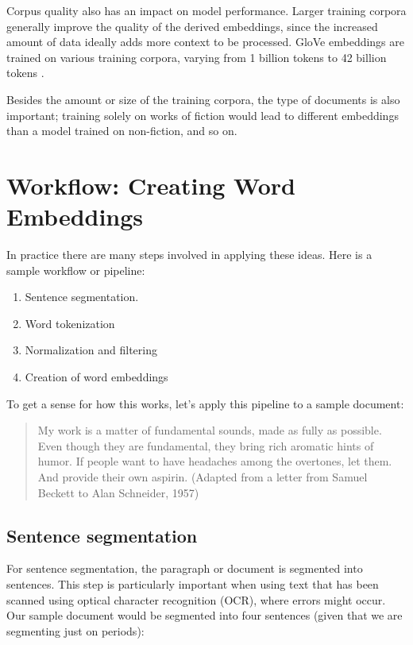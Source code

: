 Corpus quality also has an impact on model performance. Larger training corpora generally improve the quality of the derived embeddings, since the increased amount of data ideally adds more context to be processed. GloVe embeddings are trained on various training corpora, varying from 1 billion tokens to 42 billion tokens \cite{pennington2014glove}.

Besides the amount or size of the training corpora, the type of documents is also important; training solely on works of fiction would lead to different embeddings than a model trained on non-fiction, and so on.

\section{Workflow: Creating Word Embeddings}\label{createWordEmbeddings}

In practice there are many steps involved in applying these ideas. Here is a sample workflow or pipeline:
\begin{enumerate}
\item Sentence segmentation.
\item Word tokenization
\item Normalization and filtering
\item Creation of word embeddings
\end{enumerate}

To get a sense for how this works, let's apply this pipeline to a sample document:

\begin{quote}
My work is a matter of fundamental sounds, made as fully as possible. Even though they are fundamental, they bring rich aromatic hints of humor. If people want to have headaches among the overtones, let them. And provide their own aspirin. (Adapted from a letter from Samuel Beckett to Alan Schneider, 1957)
\end{quote}

\subsection{Sentence segmentation} 

For sentence segmentation, the paragraph or document is segmented into sentences. This step is particularly important when using text that has been scanned using optical character recognition (OCR), where errors might occur. Our sample document would be segmented into four sentences (given that we are segmenting just on periods):

